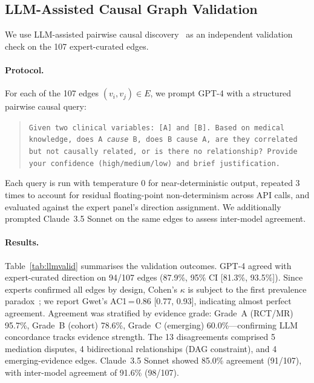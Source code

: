 \documentclass[runningheads]{llncs}
\begin{document}
\subsection{LLM-Assisted Causal Graph Validation}\label{sec:llmvalidation}

We use LLM-assisted pairwise causal
discovery~\cite{kiciman2023causal} as an independent validation
check on the 107 expert-curated edges.

\paragraph{Protocol.}
For each of the 107 edges $(v_i, v_j) \in E$, we prompt GPT-4
with a structured pairwise causal query:
\begin{quote}
\small\texttt{Given two clinical variables: [A] and [B].
Based on medical knowledge, does A \emph{cause} B, does B cause A,
are they correlated but not causally related, or is there no
relationship? Provide your confidence (high/medium/low) and
brief justification.}
\end{quote}
Each query is run with temperature 0 for near-deterministic output,
repeated 3 times to account for residual floating-point
non-determinism across API calls, and evaluated against the expert
panel's direction assignment.
We additionally prompted Claude~3.5 Sonnet on the same edges to
assess inter-model agreement.

\paragraph{Results.}
Table~\ref{tab:llmvalid} summarises the validation outcomes.
GPT-4 agreed with expert-curated direction on 94/107 edges
(87.9\%, 95\% CI [81.3\%, 93.5\%]).
Since experts confirmed all edges by design, Cohen's $\kappa$ is
subject to the first prevalence paradox~\cite{feinstein1990kappa};
we report Gwet's AC1\,=\,0.86 [0.77, 0.93], indicating almost
perfect agreement.
Agreement was stratified by evidence grade:
Grade~A (RCT/MR) 95.7\%, Grade~B (cohort) 78.6\%, Grade~C
(emerging) 60.0\%---confirming LLM concordance tracks evidence
strength.
The 13 disagreements comprised 5 mediation disputes, 4 bidirectional
relationships (DAG constraint), and 4 emerging-evidence edges.
Claude~3.5 Sonnet showed 85.0\% agreement (91/107), with
inter-model agreement of 91.6\% (98/107).
\end{document}
